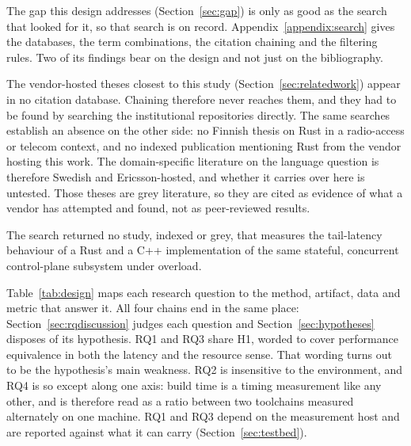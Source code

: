 \documentclass[english,oneside,a4paper,censored,csm,software-track-2020]{HYthesisML}
\begin{document}
The gap this design addresses (Section~\ref{sec:gap}) is only as good as the search that looked
for it, so that search is on record. Appendix~\ref{appendix:search} gives the databases, the term
combinations, the citation chaining and the filtering rules. Two of its findings bear on the
design and not just on the bibliography.

The vendor-hosted theses closest to this study (Section~\ref{sec:relatedwork}) appear in no
citation database. Chaining therefore never reaches them, and they had to be found by searching
the institutional repositories directly. The same searches establish an absence on the other
side: no Finnish thesis on Rust in a radio-access or telecom context, and no indexed publication
mentioning Rust from the vendor hosting this work. The domain-specific literature on the
language question is therefore Swedish and Ericsson-hosted, and whether it carries over here is
untested. Those theses are grey literature, so they are cited as evidence of what a vendor has
attempted and found, not as peer-reviewed results.

The search returned no study, indexed or grey, that measures the tail-latency behaviour of a
Rust and a C++ implementation of the same stateful, concurrent control-plane subsystem under
overload.

Table~\ref{tab:design} maps each research question to the method, artifact, data and metric that
answer it. All four chains end in the same place: Section~\ref{sec:rqdiscussion} judges each
question and Section~\ref{sec:hypotheses} disposes of its hypothesis. RQ1 and RQ3 share H1,
worded to cover performance equivalence in both the latency and the resource sense. That wording
turns out to be the hypothesis's main weakness. RQ2 is insensitive to the environment, and RQ4 is
so except along one axis: build time is a timing measurement like any other, and is therefore read
as a ratio between two toolchains measured alternately on one machine. RQ1 and RQ3 depend on the
measurement host and are reported against what it can carry (Section~\ref{sec:testbed}).
\end{document}

